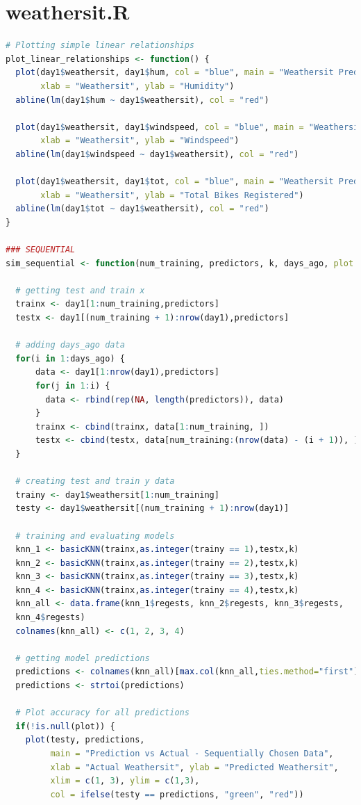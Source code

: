 \documentclass[12pt]{article}
\begin{document}
\section{weathersit.R} 
\begin{lstlisting}[language=R]
# Plotting simple linear relationships
plot_linear_relationships <- function() {
  plot(day1$weathersit, day1$hum, col = "blue", main = "Weathersit Predicted by Humidity",
       xlab = "Weathersit", ylab = "Humidity")
  abline(lm(day1$hum ~ day1$weathersit), col = "red")
  
  plot(day1$weathersit, day1$windspeed, col = "blue", main = "Weathersit Predicted by Windspeed",
       xlab = "Weathersit", ylab = "Windspeed")
  abline(lm(day1$windspeed ~ day1$weathersit), col = "red")
  
  plot(day1$weathersit, day1$tot, col = "blue", main = "Weathersit Predicted by Total Bikes Registered",
       xlab = "Weathersit", ylab = "Total Bikes Registered")
  abline(lm(day1$tot ~ day1$weathersit), col = "red")
}

### SEQUENTIAL
sim_sequential <- function(num_training, predictors, k, days_ago, plot = NULL) {
  
  # getting test and train x
  trainx <- day1[1:num_training,predictors]
  testx <- day1[(num_training + 1):nrow(day1),predictors]
  
  # adding days_ago data
  for(i in 1:days_ago) {
      data <- day1[1:nrow(day1),predictors]
      for(j in 1:i) {
        data <- rbind(rep(NA, length(predictors)), data)
      }
      trainx <- cbind(trainx, data[1:num_training, ])
      testx <- cbind(testx, data[num_training:(nrow(data) - (i + 1)), ])
  }
  
  # creating test and train y data
  trainy <- day1$weathersit[1:num_training]
  testy <- day1$weathersit[(num_training + 1):nrow(day1)]
  
  # training and evaluating models
  knn_1 <- basicKNN(trainx,as.integer(trainy == 1),testx,k)
  knn_2 <- basicKNN(trainx,as.integer(trainy == 2),testx,k)
  knn_3 <- basicKNN(trainx,as.integer(trainy == 3),testx,k)
  knn_4 <- basicKNN(trainx,as.integer(trainy == 4),testx,k)
  knn_all <- data.frame(knn_1$regests, knn_2$regests, knn_3$regests, 
  knn_4$regests)
  colnames(knn_all) <- c(1, 2, 3, 4)
    
  # getting model predictions
  predictions <- colnames(knn_all)[max.col(knn_all,ties.method="first")]
  predictions <- strtoi(predictions)
  
  # Plot accuracy for all predictions
  if(!is.null(plot)) {
    plot(testy, predictions, 
         main = "Prediction vs Actual - Sequentially Chosen Data", 
         xlab = "Actual Weathersit", ylab = "Predicted Weathersit",
         xlim = c(1, 3), ylim = c(1,3), 
         col = ifelse(testy == predictions, "green", "red"))
    

\end{lstlisting}
\end{document}
